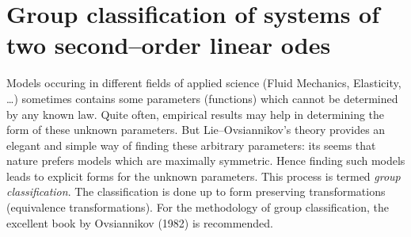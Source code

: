 \section{Group classification of systems of two second--order linear odes}

Models occuring in different fields of applied science
(Fluid Mechanics, Elasticity, \dots)  sometimes contains
some parameters (functions)  which cannot be determined by any known law.
Quite often, empirical results may help in determining the form of these
unknown parameters. But Lie--Ovsiannikov's theory provides an elegant
and simple way
of finding these arbitrary parameters: its seems that nature prefers models
which are maximally symmetric. Hence finding such models leads to explicit
forms for the unknown parameters. This process is termed
{\em group classification}.
The classification is done up to form preserving transformations (equivalence
transformations). For the methodology of group classification, the excellent
book by Ovsiannikov (1982) is recommended.

